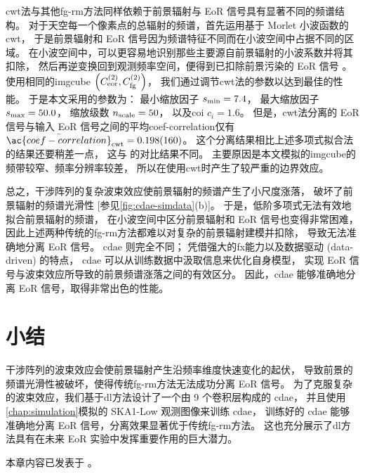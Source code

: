 \ac{cwt}法与其他\ac{fg-rm}方法同样依赖于前景辐射与 EoR 信号具有显著不同的频谱结构。
对于天空每一个像素点的总辐射的频谱，首先运用基于 Morlet 小波函数的\ac{cwt}，
于是前景辐射和 EoR 信号因为频谱特征不同而在小波空间中占据不同的区域。
在小波空间中，可以更容易地识别那些主要源自前景辐射的小波系数并将其扣除，
然后再逆变换回到观测频率空间，便得到已扣除前景污染的 EoR 信号 \cite{gu2013}。
使用相同的\ac{imgcube}
$\left( C_{\mathrm{eor}}^{(2)}, C_{\mathrm{fg}}^{(2)} \right)$，
我们通过调节\ac{cwt}法的参数以达到最佳的性能。
于是本文采用的参数为：
最小缩放因子 $s_{\mathrm{min}} = 7.4$，
最大缩放因子 $s_{\mathrm{max}} = 50.0$，
缩放级数 $n_{\mathrm{scale}} = 50$，
以及\ac{coi} $c_i = 1.6$。
但是，\ac{cwt}法分离的 EoR 信号与输入 EoR 信号之间的平均\acl{coef-correlation}仅有
$\bar{\ac{coef-correlation}}_{\R{cwt}} = \num{0.198 +- 0.160}$。
这个分离结果相比上述多项式拟合法的结果还要稍差一点，
这与  的对比结果不同。
主要原因是本文模拟的\ac{imgcube}的频带较窄、频率分辨率较差，
所以在使用\ac{cwt}时产生了较严重的边界效应。

总之，干涉阵列的复杂波束效应使前景辐射的频谱产生了小尺度涨落，
破坏了前景辐射的频谱光滑性 [参见\autoref{fig:cdae-simdata}(b)]。
于是，低阶多项式无法有效地拟合前景辐射的频谱，
在小波空间中区分前景辐射和 EoR 信号也变得非常困难，
因此上述两种传统的\ac{fg-rm}方法都难以对复杂的前景辐射建模并扣除，
导致无法准确地分离 EoR 信号。
\ac{cdae} 则完全不同；
凭借强大的\ac{fx}能力以及数据驱动 (data-driven) 的特点，
\ac{cdae} 可以从训练数据中汲取信息来优化自身模型，
实现 EoR 信号与波束效应所导致的前景频谱涨落之间的有效区分。
因此，\ac{cdae} 能够准确地分离 EoR 信号，取得非常出色的性能。


\section{小结}

干涉阵列的波束效应会使前景辐射产生沿频率维度快速变化的起伏，
导致前景的频谱光滑性被破坏，使得传统\ac{fg-rm}方法无法成功分离 EoR 信号。
为了克服复杂的波束效应，我们基于\ac{dl}方法设计了一个由 9 个卷积层构成的 \ac{cdae}，
并且使用\autoref{chap:simulation}模拟的 SKA1-Low 观测图像来训练 \ac{cdae}，
训练好的 \ac{cdae} 能够准确地分离 EoR 信号，分离效果显著优于传统\ac{fg-rm}方法。
这也充分展示了\ac{dl}方法具有在未来 EoR 实验中发挥重要作用的巨大潜力。

本章内容已发表于 \textit{\mnras} \cite{li.cdae}。


